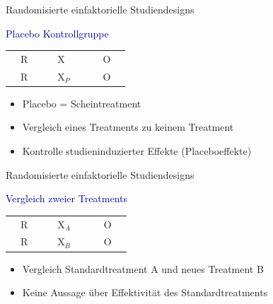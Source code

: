 \documentclass[
  8pt,
  ignorenonframetext,
]{beamer}
\providecommand{\tightlist}{%
  \setlength{\itemsep}{0pt}\setlength{\parskip}{0pt}}
\begin{document}
\begin{frame}{Randomisierte einfaktorielle Studiendesigns}
\protect\hypertarget{randomisierte-einfaktorielle-studiendesigns-2}{}
\large

\textcolor{darkblue}{Placebo Kontrollgruppe} \vspace{6mm}

\large
\center
\begin{tabular}{|clc|}
\hline
$\quad$R$\quad$  & $\quad$X     $\quad$ & $\quad$O$\quad$
\\
$\quad$R$\quad$  & $\quad$X$_P$ $\quad$ & $\quad$O$\quad$
\\\hline
\end{tabular}
\vspace{6mm}

\normalsize

\begin{itemize}
\tightlist
\item
  Placebo = Scheintreatment
\item
  Vergleich eines Treatments zu keinem Treatment
\item
  Kontrolle studieninduzierter Effekte (Placeboeffekte)
\end{itemize}
\end{frame}

\begin{frame}{Randomisierte einfaktorielle Studiendesigns}
\protect\hypertarget{randomisierte-einfaktorielle-studiendesigns-3}{}
\large

\textcolor{darkblue}{Vergleich zweier Treatments} \vspace{6mm}

\large
\center
\begin{tabular}{|clc|}
\hline
$\quad$R$\quad$  & $\quad$X$_A$ $\quad$ & $\quad$O$\quad$
\\
$\quad$R$\quad$  & $\quad$X$_B$ $\quad$ & $\quad$O$\quad$
\\\hline
\end{tabular}
\vspace{6mm}

\normalsize

\begin{itemize}
\tightlist
\item
  Vergleich Standardtreatment A und neues Treatment B
\item
  Keine Aussage über Effektivität des Standardtreatments
\end{itemize}
\end{frame}
\end{document}
